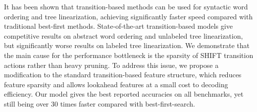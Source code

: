 It has been shown that transition-based methods can be used for syntactic word ordering and tree linearization, achieving significantly faster speed compared with traditional best-first methods. State-of-the-art transition-based models give competitive results on abstract word ordering and unlabeled tree linearization, but significantly worse results on labeled tree linearization. We demonstrate that the main cause for the performance bottleneck is the sparsity of SHIFT transition actions rather than heavy pruning. To address this issue, we propose a modification to the standard transition-based feature structure, which reduces feature sparsity and allows lookahead features at a small cost to decoding efficiency. Our model gives the best reported accuracies on all benchmarks, yet still being over 30 times faster compared with best-first-search.
